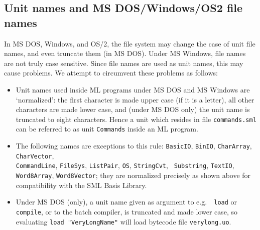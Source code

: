 \documentclass[fleqn,a4paper]{article}
\begin{document}


\subsection{Unit names and MS DOS/Windows/OS2 file names}

In MS DOS, Windows, and OS/2, the file system may change the case of
unit file names, and even truncate them (in MS DOS)\@.  Under MS
Windows, file names are not truly case sensitive.  Since file names
are used as unit names, this may cause problems.  We attempt to
circumvent these problems as follows:

\begin{itemize}
\item Unit names used inside ML programs under MS DOS and MS Windows
  are `normalized': the first character is made upper case (if it is a
  letter), all other characters are made lower case, and (under MS DOS
  only) the unit name is truncated to eight characters.  Hence a unit
  which resides in file {\tt commands.sml} can be referred to as unit
  {\tt Commands} inside an ML program.
  
\item The following names are exceptions to this rule: {\tt BasicIO},
  {\tt BinIO}, {\tt CharArray}, {\tt CharVector},\\ {\tt CommandLine},
  {\tt FileSys}, {\tt ListPair}, {\tt OS}, {\tt StringCvt}, {\tt
    Substring}, {\tt TextIO}, {\tt Word8Array}, {\tt Word8Vector};
  they are normalized precisely as shown above for compatibility with
  the SML Basis Library.

  
\item Under MS DOS (only), a unit name given as argument to e.g.\ {\tt
    load} or {\tt compile}, or to the batch compiler, is truncated and
  made lower case, so evaluating {\tt load "VeryLongName"} will load
  bytecode file {\tt verylong.uo}.
\end{itemize}
\end{document}
